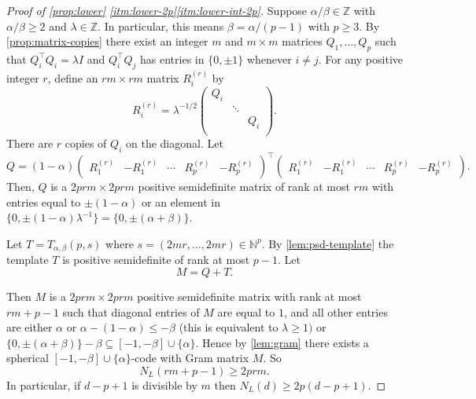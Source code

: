 \documentclass[reqno, 11pt]{amsart}
\theoremstyle{definition}
\theoremstyle{remark}
\newcommand{\NN}{\mathbb{N}}
\newcommand{\ZZ}{\mathbb{Z}}
\begin{document}
\begin{proof}[Proof of \cref{prop:lower} \ref{itm:lower-2p}\ref{itm:lower-int-2p}]
Suppose $\alpha/\beta \in \ZZ$ with $\alpha/\beta \geq 2$ and $\lambda \in \ZZ$. In particular, this means $\beta = \alpha/(p-1)$ with $p \geq 3$. By \cref{prop:matrix-copies} there exist an integer $m$ and $m\times m$ matrices $Q_1, \ldots, Q_p$ such that $Q_i^\intercal Q_i = \lambda I$ and $Q_i^\intercal Q_j$ has entries in $\{0, \pm 1\}$ whenever $i \neq j$. For any positive integer $r$, define an $rm \times rm$ matrix $R^{(r)}_i$ by 
\[
    R_i^{(r)} = \lambda^{-1/2}\begin{pmatrix}
                Q_i & & \\
                & \ddots & \\
                & & Q_i \\
                \end{pmatrix}.
\]
There are $r$ copies of $Q_i$ on the diagonal. Let
\[
    Q = (1-\alpha) \begin{pmatrix}
					R_1^{(r)} & -R_1^{(r)} & \cdots & R_p^{(r)} & -R_p^{(r)}
			      \end{pmatrix}^\intercal
                    \begin{pmatrix}
					R_1^{(r)} & -R_1^{(r)} & \cdots & R_p^{(r)} & -R_p^{(r)}
			      \end{pmatrix}.
\]
Then, $Q$ is  a $2prm \times 2prm$ positive semidefinite matrix of rank at most $rm$ with entries equal to $\pm (1-\alpha)$ or an element in $\{0, \pm(1-\alpha)\lambda^{-1}\} = \{0, \pm(\alpha + \beta)\}$.

Let $T = T_{\alpha, \beta}(p,s)$ where $s = (2mr, \ldots, 2mr) \in \NN^p$. By \cref{lem:psd-template} the template $T$ is positive semidefinite of rank at most $p-1$. Let
\[
    M = Q + T.
\]

Then $M$ is a $2prm \times 2prm$ positive semidefinite matrix with rank at most $rm + p-1$ such that diagonal entries of $M$ are equal to $1$, and all other entries are either $\alpha$ or $\alpha - (1-\alpha) \leq -\beta$ (this is equivalent to $\lambda \geq 1)$ or $\{0, \pm(\alpha + \beta)\}-\beta \subseteq [-1,-\beta]\cup \{\alpha\}$. Hence by \cref{lem:gram} there exists a spherical $[-1,-\beta] \cup \{\alpha\}$-code with Gram matrix $M$. So 
\[
    N_L(rm + p-1) \geq 2prm.
\]
In particular, if $d - p + 1$ is divisible by $m$ then $N_L(d) \geq 2p(d-p+1)$.
\end{proof}
\medskip
\end{document}
